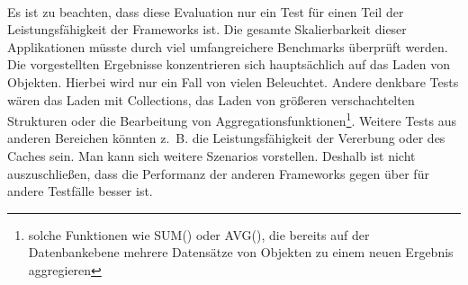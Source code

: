 \\
Es ist zu beachten, dass diese Evaluation nur ein Test für einen Teil der Leistungsfähigkeit der Frameworks ist. Die gesamte Skalierbarkeit dieser Applikationen müsste durch viel umfangreichere Benchmarks überprüft werden. Die vorgestellten Ergebnisse konzentrieren sich hauptsächlich auf das Laden von Objekten. Hierbei wird nur ein Fall von vielen Beleuchtet. Andere denkbare Tests wären das Laden mit Collections, das Laden von größeren verschachtelten Strukturen oder die Bearbeitung von Aggregationsfunktionen\footnote{solche Funktionen wie SUM() oder AVG(), die bereits auf der Datenbankebene mehrere Datensätze von Objekten zu einem neuen Ergebnis aggregieren}. Weitere Tests aus anderen Bereichen könnten z.~B. die Leistungsfähigkeit der Vererbung oder des Caches sein. Man kann sich weitere Szenarios vorstellen. Deshalb ist nicht auszuschließen, dass die Performanz der anderen Frameworks gegen über \PSCORM für andere Testfälle besser ist.\\
